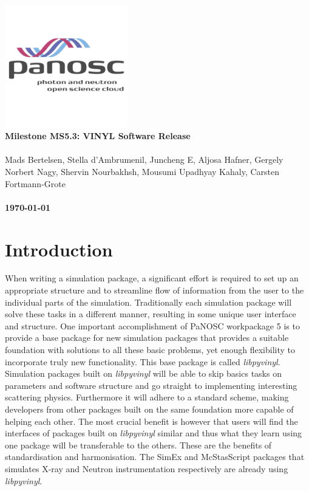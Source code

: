 \documentclass[10pt]{scrartcl}
\begin{document}
\makeatletter
\begin{titlepage}
\thispagestyle{scrheadings}
\ohead{}
\ihead{}
\chead{}
\ifoot{}
\ofoot{}
\noindent%
\includegraphics[width=0.4\textwidth]{figures/PaNOSClogo_web_RGB_512x512.jpg}\\
\Huge{%
\renewcommand{\baselinestretch}{2.0}%
  \textbf{%
    Milestone MS5.3: VINYL Software Release\\
  }%
}%
\\
{%
\Large{%
  Mads Bertelsen,
  Stella d'Ambrumenil,
  Juncheng E,
  Aljosa Hafner,
  Gergely Norbert Nagy,
  Shervin Nourbakhsh,
  Mousumi Upadhyay Kahaly,
  Carsten Fortmann-Grote
  \bigskip\\
  \bigskip\\
  \textbf{\today}%
}}%
\end{titlepage}
\makeatother

\section{Introduction}
When writing a simulation package, a significant effort is required to set up an appropriate structure and to streamline flow of information from the user to the individual parts of the simulation. Traditionally each simulation package will solve these tasks in a different manner, resulting in some unique user interface and structure. One important accomplishment of PaNOSC workpackage 5 is to provide a base package for new simulation packages that provides a suitable foundation with solutions to all these basic problems, yet enough flexibility to incorporate truly new functionality. This base package is called \textit{libpyvinyl}. Simulation packages built on \textit{libpyvinyl} will be able to skip basics tasks on parameters and software structure and go straight to implementing interesting scattering physics. Furthermore it will adhere to a standard scheme, making developers from other packages built on the same foundation more capable of helping each other. The most crucial benefit is however that users will find the interfaces of packages built on \textit{libpyvinyl} similar and thus what they learn using one package will be transferable to the others. These are the benefits of standardisation and harmonisation. The SimEx and McStasScript packages that simulates X-ray and Neutron instrumentation respectively are already using \textit{libpyvinyl}.
\end{document}
